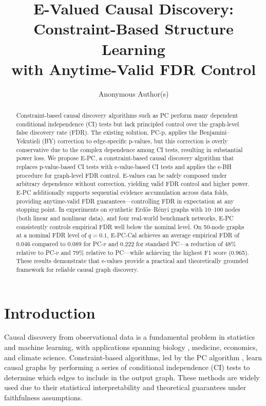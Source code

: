 \documentclass[11pt]{article}
\title{E-Valued Causal Discovery: Constraint-Based Structure Learning\\ with Anytime-Valid FDR Control}
\author{
  Anonymous Author(s)
}
\date{}
\newcommand{\epc}{\textsc{E-PC}}
\newcommand{\pcp}{\textsc{PC-p}}
\begin{document}
\maketitle

\begin{abstract}
Constraint-based causal discovery algorithms such as PC perform many dependent conditional independence (CI) tests but lack principled control over the graph-level false discovery rate (FDR). The existing solution, PC-p, applies the Benjamini--Yekutieli (BY) correction to edge-specific p-values, but this correction is overly conservative due to the complex dependence among CI tests, resulting in substantial power loss. We propose \epc{}, a constraint-based causal discovery algorithm that replaces p-value-based CI tests with e-value-based CI tests and applies the e-BH procedure for graph-level FDR control. E-values can be safely composed under arbitrary dependence without correction, yielding valid FDR control and higher power. \epc{} additionally supports sequential evidence accumulation across data folds, providing anytime-valid FDR guarantees---controlling FDR in expectation at any stopping point. In experiments on synthetic Erd\H{o}s--R\'{e}nyi graphs with 10--100 nodes (both linear and nonlinear data), and four real-world benchmark networks, \epc{} consistently controls empirical FDR well below the nominal level. On 50-node graphs at a nominal FDR level of $q = 0.1$, \epc{}-Cal achieves an average empirical FDR of 0.046 compared to 0.089 for \pcp{} and 0.222 for standard PC---a reduction of 48\% relative to \pcp{} and 79\% relative to PC---while achieving the highest F1 score (0.965). These results demonstrate that e-values provide a practical and theoretically grounded framework for reliable causal graph discovery.
\end{abstract}

\section{Introduction}

Causal discovery from observational data is a fundamental problem in statistics and machine learning, with applications spanning biology \citep{sachs2005causal}, medicine, economics, and climate science. Constraint-based algorithms, led by the PC algorithm \citep{spirtes2000causation}, learn causal graphs by performing a series of conditional independence (CI) tests to determine which edges to include in the output graph. These methods are widely used due to their statistical interpretability and theoretical guarantees under faithfulness assumptions.
\end{document}
